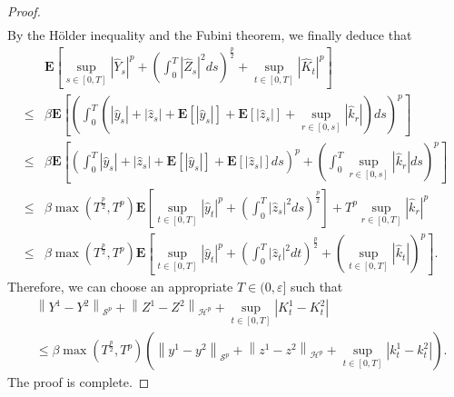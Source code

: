 \documentclass[10pt,a4paper]{amsart}
\def \E{\mathbf{E}}
\begin{document}
\begin{proof}
\begin{align*}
\end{align*}
By the H\"{o}lder inequality and the Fubini theorem, we finally deduce that 
\begin{align*}
&\E\left[\sup_{s\in[0,T]}|\hat{Y}_s|^p+\left(\int_0^T |\hat{Z}_s|^2 d s\right)^{\frac{p}{2}}+\sup_{t\in[0,T]}|\hat{K}_t|^p\right]\\
\leq &\beta\E\left[\left(\int_0^T \left(|\hat{y}_s|+|\hat{z}_s|+\E[|\hat{y}_s|]+\E[|\hat{z}_s|]+\sup_{r\in[0,s]}|\hat{k}_r|\right)ds\right)^p\right]\\
\leq &\beta\E\left[\left(\int_0^T |\hat{y}_s|+|\hat{z}_s|+\E[|\hat{y}_s|]+\E[|\hat{z}_s|]ds\right)^p+\left(\int_0^T\sup_{r\in[0,s]}|\hat{k}_r|ds\right)^p\right]\\
\leq &\beta\max\left(T^{\frac{p}{2}},T^p\right)\E\left[\sup_{t\in[0,T]}|\hat{y}_t|^p+\left(\int_0^T|\hat{z}_s|^2 ds\right)^{\frac{p}{2}}\right]+ T^p \sup_{r\in[0,T]}|\hat{k}_r|^p\\
\leq &\beta\max\left(T^{\frac{p}{2}},T^p\right)\E\left[\sup_{t\in[0,T]}|\hat{y}_t|^p+\left(\int_0^T|\hat{z}_t|^2 dt\right)^{\frac{p}{2}}+\left(\sup_{t\in[0,T]}|\hat{k}_t|\right)^p\right].
\end{align*}
Therefore, we can choose an appropriate  $T \in(0,\varepsilon]$ such that
$$
\begin{aligned}
  &\left\|Y^{1}-Y^{2}\right\|_{\mathcal{S}^{p}}+\left\|Z^{1}-Z^{2}\right\|_{\mathcal{H}^{p}}+\sup_{t\in[0,T]}\left|K_{t}^{1}-K_{t}^{2}\right|\\
  &\leq \beta\max\left(T^{\frac{p}{2}},T^p\right) \left(\left\|y^1-y^2\right\|_{\mathcal{S}^{p}}+\left\|z^1-z^2\right\|_{\mathcal{H}^{p}}+\sup_{t\in[0,T]}\left|k_t^1-k_t^2\right|\right). %
\end{aligned}
$$
The proof is complete.
\end{proof}
\end{document}
